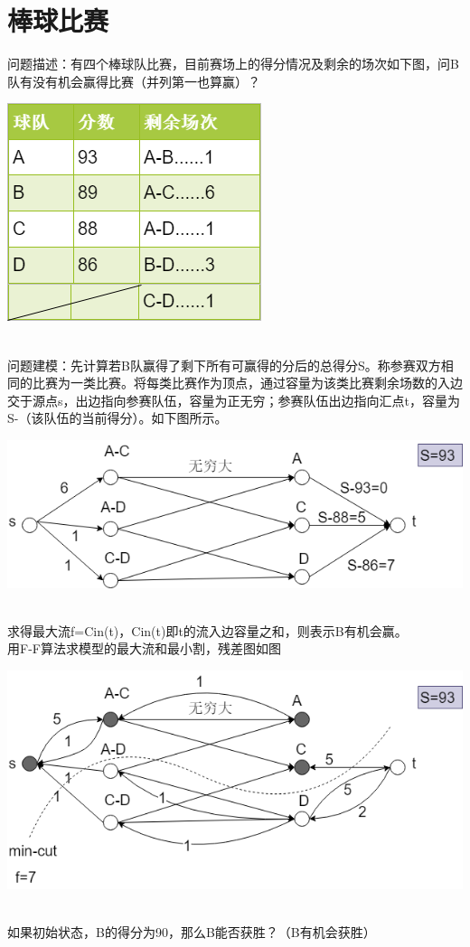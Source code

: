 \section{棒球比赛}
问题描述：有四个棒球队比赛，目前赛场上的得分情况及剩余的场次如下图，问B队有没有机会赢得比赛（并列第一也算赢）？\\
\centerline{\includegraphics[scale=0.6]{image/networkflow5.png}}
\\问题建模：先计算若B队赢得了剩下所有可赢得的分后的总得分S。称参赛双方相同的比赛为一类比赛。将每类比赛作为顶点，通过容量为该类比赛剩余场数的入边交于源点s，出边指向参赛队伍，容量为正无穷；参赛队伍出边指向汇点t，容量为S-（该队伍的当前得分）。如下图所示。\\
\centerline{\includegraphics[scale=0.6]{image/networkflow6.png}}
\\求得最大流f=Cin(t)，Cin(t)即t的流入边容量之和，则表示B有机会赢。
\\用F-F算法求模型的最大流和最小割，残差图如图\\
\centerline{\includegraphics[scale=0.6]{image/networkflow7.png}}
\\如果初始状态，B的得分为90，那么B能否获胜？（B有机会获胜）


